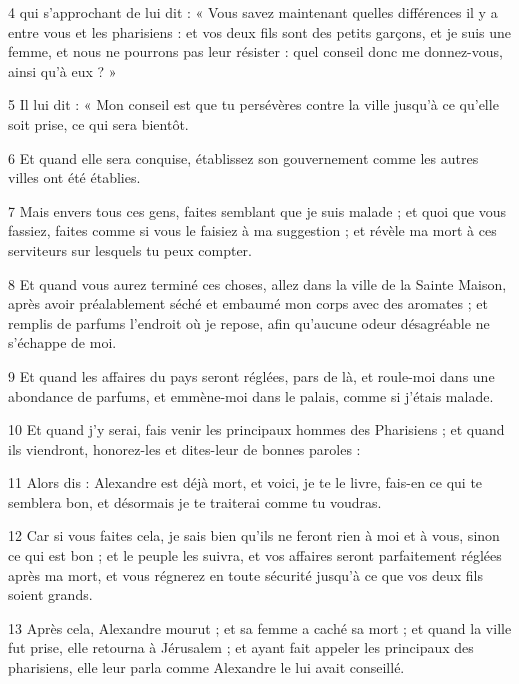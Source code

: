 \par 4 qui s'approchant de lui dit : « Vous savez maintenant quelles différences il y a entre vous et les pharisiens : et vos deux fils sont des petits garçons, et je suis une femme, et nous ne pourrons pas leur résister : quel conseil donc me donnez-vous, ainsi qu'à eux ? »

\par 5 Il lui dit : « Mon conseil est que tu persévères contre la ville jusqu'à ce qu'elle soit prise, ce qui sera bientôt.

\par 6 Et quand elle sera conquise, établissez son gouvernement comme les autres villes ont été établies.

\par 7 Mais envers tous ces gens, faites semblant que je suis malade ; et quoi que vous fassiez, faites comme si vous le faisiez à ma suggestion ; et révèle ma mort à ces serviteurs sur lesquels tu peux compter.

\par 8 Et quand vous aurez terminé ces choses, allez dans la ville de la Sainte Maison, après avoir préalablement séché et embaumé mon corps avec des aromates ; et remplis de parfums l'endroit où je repose, afin qu'aucune odeur désagréable ne s'échappe de moi.

\par 9 Et quand les affaires du pays seront réglées, pars de là, et roule-moi dans une abondance de parfums, et emmène-moi dans le palais, comme si j'étais malade.

\par 10 Et quand j'y serai, fais venir les principaux hommes des Pharisiens ; et quand ils viendront, honorez-les et dites-leur de bonnes paroles :

\par 11 Alors dis : Alexandre est déjà mort, et voici, je te le livre, fais-en ce qui te semblera bon, et désormais je te traiterai comme tu voudras.

\par 12 Car si vous faites cela, je sais bien qu'ils ne feront rien à moi et à vous, sinon ce qui est bon ; et le peuple les suivra, et vos affaires seront parfaitement réglées après ma mort, et vous régnerez en toute sécurité jusqu'à ce que vos deux fils soient grands.

\par 13 Après cela, Alexandre mourut ; et sa femme a caché sa mort ; et quand la ville fut prise, elle retourna à Jérusalem ; et ayant fait appeler les principaux des pharisiens, elle leur parla comme Alexandre le lui avait conseillé.

